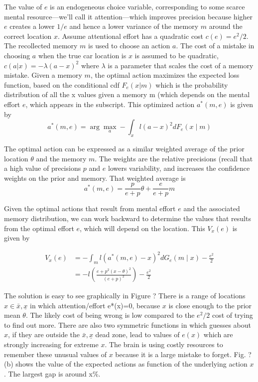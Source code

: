\documentclass{article}
\begin{document}
The value of $e$ is an endogeneous choice variable, corresponding to some scarce mental resource—we’ll call it attention—which improves precision because higher $e$ creates a lower $1/e$ and hence a lower variance of the memory $m$ around the correct location $x$.  
Assume attentional effort has a quadratic cost $c(e)=e^2/2$. The recollected memory $m$ is used to choose an action $a$. The cost of a mistake in choosing $a$ when the true car location is $x$ is assumed to be quadratic, $c(a|x)=-\lambda(a-x)^2$ where $\lambda$ is a parameter that scales the cost of a memory mistake. 
Given a memory $m$, the optimal action maximizes the expected loss function, based on the conditional cdf $F_e(x|m)$ which is the probability distribution of all the x values given a memory m (which depends on the mental effort $e$, which appears in the subscript. This optimized action $a^*(m,e)$ is given by
$$
a^{*}(m, e)=\arg \max _{a}-\int_{x} l(a-x)^{2} d F_{e}(x \mid m)
$$

The optimal action can be expressed as a similar weighted average of the prior location $\theta$ and the memory $m$. The weights are the relative precisions (recall that a high value of precisions $p$ and $e$ lowers variability, and increases the confidence weights on the prior and memory. That weighted average is
$$
a^{*}(m, e)=\frac{p}{e+p} \theta+\frac{e}{e+p} m
$$

Given the optimal actions that result from mental effort $e$ and the associated memory distribution, we can work backward to determine the values that results from the optimal effort $e$, which will depend on the location. This $V_x(e)$ is given by

$$
\begin{aligned}
V_{x}(e) &=-\int_{m} l\left(a^{*}(m, e)-x\right)^{2} d G_{e}(m \mid x)-\frac{e^{2}}{2} \\
&=-l\left(\frac{e+p^{2}(x-\theta)^{2}}{(e+p)^{2}}\right)-\frac{e^{2}}{2}
\end{aligned}
$$

The solution is easy to see graphically in Figure ?  There is a range of locations $x \in {\bar{x},\underline{x}}$  in which attention/effort e*(x)=0, because $x$ is close enough to the prior mean $\theta$. The likely cost of being wrong is low compared to the $e^2/2$ cost of trying to find out more. 
There are also two symmetric functions in which guesses about $x$, if they are outside the ${\bar{x},\underline{x}}$  dead zone, lead to values of $e(x)$ which are strongly increasing for extreme $x$. The brain is using costly resources to remember these unusual values of $x$ because it is a large mistake to forget. 
Fig. ?(b) shows the value of the expected actions as  function of the underlying action $x$. The largest gap is around x\%. 
\end{document}
